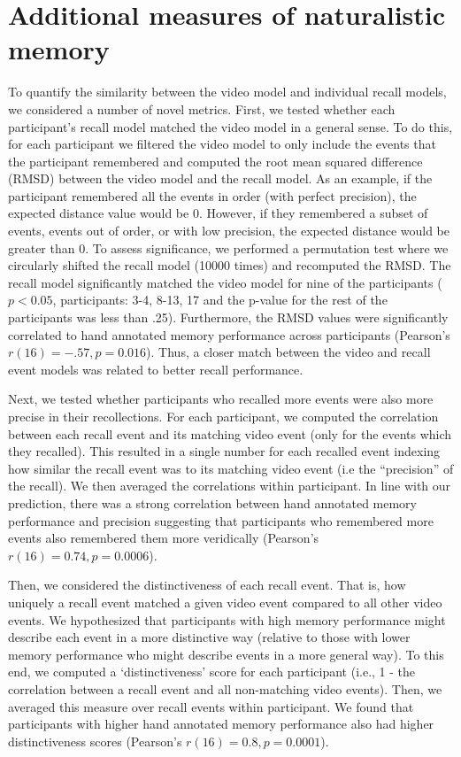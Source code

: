 \documentclass{article}
\begin{document}
\section*{Additional measures of naturalistic memory}
To quantify the similarity between the video model and individual recall models, we considered a number of novel metrics.  First, we tested whether each participant's recall model matched the video model in a general sense. To do this, for each participant we filtered the video model to only include the events that the participant remembered and computed the root mean squared difference (RMSD) between the video model and the recall model. As an example, if the participant remembered all the events in order (with perfect precision), the expected distance value would be 0. However, if they remembered a subset of events, events out of order, or with low precision, the expected distance would be greater than 0. To assess significance, we performed a permutation test where we circularly shifted the recall model (10000 times) and recomputed the RMSD. The recall model significantly matched the video model for nine of the participants ($p < 0.05$, participants: 3-4, 8-13, 17 and the p-value for the rest of the participants was less than .25). Furthermore, the RMSD values were significantly correlated to hand annotated memory performance across participants (Pearson's $r(16) =-.57, p = 0.016$). Thus, a closer match between the video and recall event models was related to better recall performance.

Next, we tested whether participants who recalled more events were also more precise in their recollections. For each participant, we computed the correlation between each recall event and its matching video event (only for the events which they recalled). This resulted in a single number for each recalled event indexing how similar the recall event was to its matching video event (i.e the ``precision'' of the recall). We then averaged the correlations within participant. In line with our prediction, there was a strong correlation between hand annotated memory performance and precision suggesting that participants who remembered more events also remembered them more veridically (Pearson's $r(16) = 0.74, p = 0.0006$).

Then, we considered the distinctiveness of each recall event. That is, how uniquely a recall event matched a given video event compared to all other video events. We hypothesized that participants with high memory performance might describe each event in a more distinctive way (relative to those with lower memory performance who might describe events in a more general way). To this end, we computed a `distinctiveness' score for each participant (i.e., 1 - the correlation between a recall event and all non-matching video events).  Then, we averaged this measure over recall events within participant.  We found that participants with higher hand annotated memory performance also had higher distinctiveness scores (Pearson's $r(16) = 0.8, p = 0.0001$).
\end{document}
